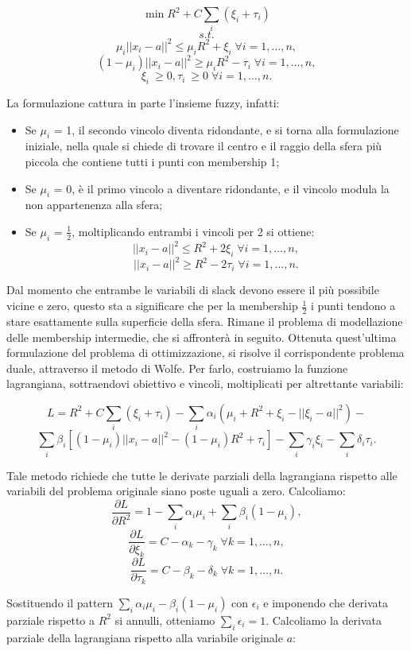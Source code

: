 \documentclass[12pt,a4paper]{report}
\begin{document}
\[\min R^2 + C\sum_{i} (\xi_{i} + \tau_{i})\]
\[s.t.\]
\[ \mu_i||x_i - a||^2  \leq \mu_i R^2 + \xi_{i} \; \forall i = 1, \dots, n,\]
\[ (1 - \mu_i)||x_i - a||^2  \geq \mu_i R^2 - \tau_{i}  \; \forall i = 1, \dots, n,\]
\[ \xi_{i}\ \geq 0, \tau_{i}\ \geq 0  \; \forall i = 1, \dots, n.\]

La formulazione cattura in parte l'insieme fuzzy, infatti:
\begin{itemize}
  \item Se  $\mu_i$ = 1, il secondo vincolo diventa ridondante, e si torna alla formulazione iniziale, nella quale si chiede di trovare il centro  e il raggio della sfera più piccola che contiene tutti i punti con membership 1;
  \item Se   $\mu_i$ = 0, è il primo vincolo a diventare ridondante, e il vincolo modula la non appartenenza alla sfera;		
  \item Se   $\mu_i$ = $\frac{1}{2}$, moltiplicando entrambi i vincoli per 2 si ottiene:
\[ ||x_i - a||^2  \leq R^2 + 2\xi_{i} \; \forall i = 1, \dots, n,\]
\[ ||x_i - a||^2  \geq R^2 - 2\tau_{i}\; \forall i = 1, \dots, n.\]
\end{itemize}

Dal momento che entrambe le variabili di slack devono essere il più possibile vicine e zero, questo sta a significare che per la membership  $\frac{1}{2}$ i punti tendono a stare esattamente sulla superficie della sfera. Rimane il problema di modellazione delle membership intermedie, che si affronterà in seguito.
Ottenuta quest'ultima formulazione del problema di ottimizzazione, si risolve il corrispondente problema duale, attraverso il metodo di Wolfe. Per farlo, costruiamo la funzione lagrangiana, sottraendovi obiettivo e vincoli, moltiplicati per altrettante variabili:

\[ L = R^2 + C\sum_{i}(\xi_i + \tau_i) - \sum_{i}\alpha_i(\mu_i+R^2 + \xi_i - ||\xi_i - a||^2) -\] 
\[\sum_{i}\beta_i[(1- \mu_i)||x_i - a||^2 - (1 - \mu_i)R^2 + \tau_i] -  \sum_{i}\gamma_i\xi_i - \sum_{i}\delta_i\tau_i.\]

Tale metodo richiede che tutte le derivate parziali della lagrangiana rispetto alle variabili del problema originale siano poste uguali a zero. Calcoliamo:
\[ \frac{\partial L}{\partial R^2} = 1- \sum_{i}\alpha_i\mu_i + \sum_{i}\beta_i(1 - \mu_i),\]
\[ \frac{\partial L}{\partial \xi_k} = C - 	\alpha_k - \gamma_k  \; \forall k = 1, \dots, n,\]
\[ \frac{\partial L}{\partial \tau_k} = C - \beta_k - \delta_k  \; \forall k = 1, \dots, n.\]

Sostituendo il pattern $\sum_{i}\alpha_i\mu_i - \beta_i(1-\mu_i)$ con $\epsilon_i$ e imponendo che derivata parziale rispetto a $R^2$ si annulli, otteniamo $\sum_{i}\epsilon_i = 1$.
Calcoliamo la derivata parziale della lagrangiana rispetto alla variabile originale $a$:
\end{document}
